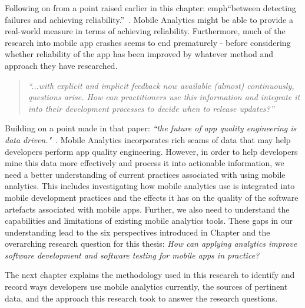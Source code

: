 Following on from a point raised earlier in this chapter: emph{``between detecting failures and achieving reliability.''}~. Mobile Analytics might be able to provide a real-world measure in terms of achieving reliability. Furthermore, much of the research into mobile app crashes seems to end prematurely - before considering whether reliability of the app has been improved by whatever method and approach they have researched.

\begin{quote}
    \emph{``...with explicit and implicit feedback now available (almost) continuously, questions arise. How can practitioners use this information and integrate it into their development processes to decide when to release updates?''}    
\end{quote}

Building on a point made in that paper: \emph{``the future of app quality engineering is data driven."}~. Mobile Analytics incorporates rich seams of data that may help developers perform app quality engineering. However, in order to help developers mine this data more effectively and process it into actionable information, we need a better understanding of current practices associated with using mobile analytics. This includes investigating how mobile analytics use is integrated into mobile development practices and the effects it has on the quality of the software artefacts associated with mobile apps. Further, we also need to understand the capabilities and limitations of existing mobile analytics tools. These gaps in our understanding lead to the six perspectives introduced in Chapter  and the overarching research question for this thesis: \emph{How can applying analytics improve software development and software testing for mobile apps in practice?}

The next chapter explains the methodology used in this research to identify and record ways developers use mobile analytics currently, the sources of pertinent data, and the approach this research took to answer the research questions.


